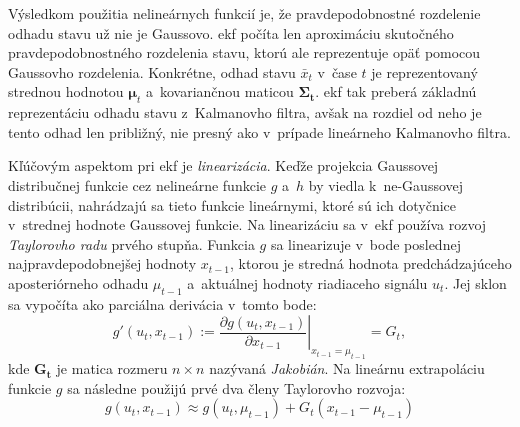      Výsledkom použitia nelineárnych funkcií je, že pravdepodobnostné rozdelenie odhadu stavu už nie je Gaussovo\@. \acrshort{ekf} počíta len aproximáciu skutočného pravdepodobnostného rozdelenia stavu, ktorú ale reprezentuje opäť pomocou Gaussovho rozdelenia. Konkrétne, odhad stavu $\bar{x}_t$ v~čase $t$ je reprezentovaný strednou hodnotou $\bm{\mu}_t$ a~kovariančnou maticou $\bm{\Sigma_t}$\@. \acrshort{ekf} tak preberá základnú reprezentáciu odhadu stavu z~Kalmanovho filtra, avšak na rozdiel od neho je tento odhad len približný, nie presný ako v~prípade lineárneho Kalmanovho filtra.

      \begin{algorithm}[t]
      \caption[Rozšírený Kalmanov filter]{Rozšírený Kalmanov filter podľa~\cite{thrunProbabilisticRobotics2005}}\label{alg:ekf}
      \begin{algorithmic}



      \end{algorithmic}
    \end{algorithm}

    Kľúčovým aspektom pri \acrshort{ekf} je \emph{linearizácia}. Keďže projekcia Gaussovej distribučnej funkcie cez nelineárne funkcie $g$ a~$h$ by viedla k~ne-Gaussovej distribúcii, nahrádzajú sa tieto funkcie lineárnymi, ktoré sú ich dotyčnice v~strednej hodnote Gaussovej funkcie. Na linearizáciu sa v~\acrshort{ekf} používa rozvoj \emph{Taylorovho radu} prvého stupňa. Funkcia $g$ sa linearizuje v~bode poslednej najpravdepodobnejšej hodnoty $x_{t-1}$, ktorou je stredná hodnota predchádzajúceho aposteriórneho odhadu $\mu_{t-1}$ a~aktuálnej hodnoty riadiaceho signálu $u_t$. Jej sklon sa vypočíta ako parciálna derivácia v~tomto bode:
    \begin{equation}
      g'(u_t, x_{t-1}) := \left. \frac{\partial g(u_t, x_{t-1})}{\partial x_{t-1}} \right|_{x_{t-1} = \mu_{t-1}} = G_t,
    \end{equation}
    kde  $\bm{G_t}$ je matica rozmeru $n \times n$ nazývaná \emph{Jakobián}. Na lineárnu extrapoláciu funkcie $g$ sa následne použijú prvé dva členy Taylorovho rozvoja:
    \begin{equation}
      g(u_t, x_{t-1}) \approx g(u_t, \mu_{t-1}) + G_t (x_{t-1} - \mu_{t-1})
    \end{equation}

